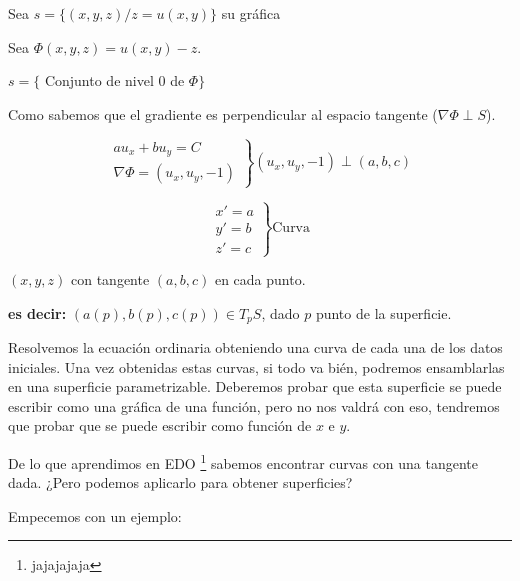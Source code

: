 	Sea $s = \{(x,y,z) / z = u(x,y)\}$ su gráfica

	Sea $\Phi(x,y,z) = u(x,y) - z$.

	$s = \{$ Conjunto de nivel 0 de $ \Phi \}$

	Como sabemos que el gradiente es perpendicular al espacio tangente ($\nabla \Phi \perp S$).

	\begin{equation*}
		\left.
		\begin{array}{rl}
			au_x + bu_y = C \\
			\nabla \Phi = (u_x, u_y, -1)
		\end{array}
		\right\} (u_x,u_y, -1) \perp (a,b,c)
	\end{equation*}

	\begin{equation*}
		\left.
		\begin{array}{rl}
			x' = a \\
			y' = b \\
			z' = c
		\end{array}
		\right\} \text{Curva}
	\end{equation*}

	$(x,y,z)$ con tangente $(a,b,c)$ en cada punto.

	\textbf{es decir:} $(a(p),b(p),c(p)) \in T_pS$, dado $p$ punto de la superficie.


	Resolvemos la ecuación ordinaria obteniendo una curva de cada una de los datos iniciales. Una vez obtenidas estas curvas, si todo va bién, podremos ensamblarlas en una superficie parametrizable. Deberemos probar que esta superficie se puede escribir como una gráfica de una función, pero no nos valdrá con eso, tendremos que probar que se puede escribir como función de $x$ e $y$.

	De lo que aprendimos en EDO \footnote{jajajajaja} sabemos encontrar curvas con una tangente dada. ¿Pero podemos aplicarlo para obtener superficies?

	Empecemos con un ejemplo:

